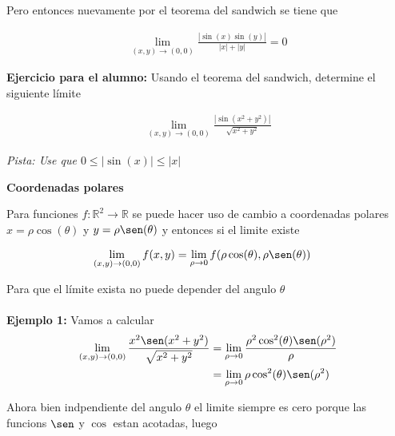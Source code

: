 \documentclass{article}
\theoremstyle{definition}
\begin{document}
Pero entonces nuevamente por el teorema del sandwich se tiene que


\begin{align*}
    \lim_{(x,y) \to (0,0)} \frac{|\sin(x)\sin(y)|}{|x|+|y|} = 0
\end{align*}

\textbf{Ejercicio para el alumno: }Usando el teorema del sandwich, determine el siguiente l\'imite

\begin{align*}
    \lim_{(x,y) \to (0,0)} \frac{|\sin(x^2+y^2)|}{\sqrt{x^2+y^2}}
\end{align*}

\textit{Pista: Use que $0 \leq |\sin(x)| \leq |x|$}



\newpage



\begin{center}
\textbf{\large{Coordenadas polares}} \\
\end{center}



Para funciones $f: \mathbb{R}^2 \to \mathbb{R}$ se puede hacer uso de cambio a coordenadas polares $x = \rho \cos(\theta)$ y $y = \rho \sen(\theta)$ y entonces si el limite existe



\begin{align*}
\displaystyle \lim_{(x,y) \to (0,0)}   f(x,y)   &=  \lim_{\rho \to 0} f(\rho \cos(\theta), \rho \sen(\theta))
\end{align*}

Para que el límite exista no puede depender del angulo $\theta$ \\ \\




\textbf{Ejemplo 1: } Vamos a calcular \\


\begin{align*}
\displaystyle \lim_{(x,y) \to (0,0)}   \frac{x^2\sen(x^2+y^2)}{\sqrt{x^2+y^2}}  &=  \lim_{\rho \to 0}  \frac{\rho^2 \cos^2(\theta)\sen(\rho^2)}{\rho} \\
&=  \lim_{\rho \to 0}  \rho \cos^2(\theta)\sen(\rho^2) \\
\end{align*}

Ahora bien indpendiente del angulo $\theta$ el limite siempre es cero porque las funcions $\sen$ y $\cos$ estan acotadas, luego
\end{document}
